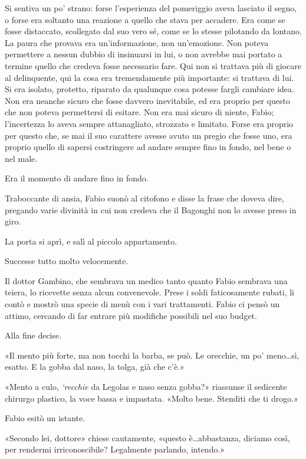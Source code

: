 Si sentiva un po' strano: forse l'esperienza del pomeriggio aveva lasciato il segno, o forse era soltanto una reazione a quello che stava per accadere. Era come se fosse distaccato, scollegato dal suo vero sé, come se lo stesse pilotando da lontano. La paura che provava era un'informazione, non un'emozione. Non poteva permettere a nessun dubbio di insinuarsi in lui, o non avrebbe mai portato a termine quello che credeva fosse necessario fare. Qui non si trattava più di giocare al delinquente, qui la cosa era tremendamente più importante: si trattava di lui. Si era isolato, protetto, riparato da qualunque cosa potesse fargli cambiare idea. Non era neanche sicuro che fosse davvero inevitabile, ed era proprio per questo che non poteva permettersi di esitare. Non era mai sicuro di niente, Fabio; l'incertezza lo aveva sempre attanagliato, strozzato e limitato. Forse era proprio per questo che, se mai il suo carattere avesse avuto un pregio che fosse uno, era proprio quello di sapersi costringere ad andare sempre fino in fondo, nel bene o nel male.

Era il momento di andare fino in fondo.

Traboccante di ansia, Fabio suonò al citofono e disse la frase che doveva dire, pregando varie divinità in cui non credeva che il Bagonghi non lo avesse preso in giro. 

La porta si aprì, e salì al piccolo appartamento.

Successe tutto molto velocemente.

Il dottor Gambino, che sembrava un medico tanto quanto Fabio sembrava una teiera, lo ricevette senza alcun convenevole. Prese i soldi faticosamente rubati, li contò e mostrò una specie di menù con i vari trattamenti. Fabio ci pensò un attimo, cercando di far entrare più modifiche possibili nel suo budget.

Alla fine decise.

«Il mento più forte, ma non tocchi la barba, se può. Le orecchie, un po' meno\ldots \thinspace sì, esatto. E la gobba dal naso, la tolga, già che c'è.»

«Mento a culo, \textit{`recchie} da Legolas e naso senza gobba?» riassunse il sedicente chirurgo plastico, la voce bassa e impastata. «Molto bene. Stenditi che ti drogo.»

Fabio esitò un istante. 

«Secondo lei, dottore» chiese cautamente, «questo è\ldots \thinspace abbastanza, diciamo così, per rendermi irriconoscibile? Legalmente parlando, intendo.»

